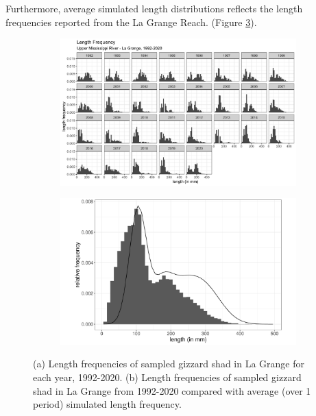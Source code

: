 \documentclass[preprint,review,12pt,authoryear]{elsarticle}
\begin{document}
Furthermore, average simulated length distributions reflects the length frequencies reported from the La Grange Reach. (Figure \ref{fig:lagrange}). 
\begin{figure}
\centering
\begin{subfigure}[b]{.43\textwidth}
  \includegraphics[width=\textwidth]{figures/LTRMlg.png}
   \caption{}
  \label{fig:LTRMlg}
\end{subfigure}
\begin{subfigure}[b]{.43\textwidth}
   \includegraphics[width=\textwidth]{figures/lagrange.pdf}
     \caption{}
\label{fig:lagrange}
\end{subfigure}
\caption{(a) Length frequencies of sampled gizzard shad in La Grange for each year, 1992-2020. (b) Length frequencies of sampled gizzard shad in La Grange from 1992-2020 compared with average (over 1 period) simulated length frequency.}
\end{figure}    

\end{document}
